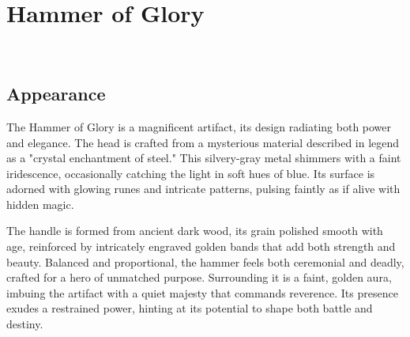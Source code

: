 \ItemCategory{}
\ItemSubCategory{}
\ItemFolder{}

\chapter*{Hammer of Glory}
\\

%
	
\section*{Appearance}
{\entryfont The Hammer of Glory is a magnificent artifact, its design radiating both power and elegance. The head is crafted from a mysterious material described in legend as a "crystal enchantment of steel." This silvery-gray metal shimmers with a faint iridescence, occasionally catching the light in soft hues of blue. Its surface is adorned with glowing runes and intricate patterns, pulsing faintly as if alive with hidden magic.

The handle is formed from ancient dark wood, its grain polished smooth with age, reinforced by intricately engraved golden bands that add both strength and beauty. Balanced and proportional, the hammer feels both ceremonial and deadly, crafted for a hero of unmatched purpose. Surrounding it is a faint, golden aura, imbuing the artifact with a quiet majesty that commands reverence. Its presence exudes a restrained power, hinting at its potential to shape both battle and destiny.}

